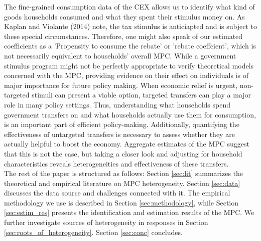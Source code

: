The fine-grained consumption data of the CEX allows us to identify what kind of goods households consumed and what they spent their stimulus money on. As Kaplan and Violante (2014) note, the tax stimulus is anticiapted and is subject to these special circumstances. Therefore, one might also speak of our estimated coefficients as a 'Propensity to consume the rebate' or 'rebate coeffcient', which is not necessarily equivalent to households' overall MPC. While a government stimulus program might not be perfectly appropriate to verify theoretical models concerned with the MPC, providing evidence on their effect on individuals is of major importance for future policy making. When economic relief is urgent, non-targeted stimuli can present a viable option, targeted transfers can play a major role in many policy settings. Thus, understanding what households spend government transfers on and what households actually use them for consumption, is an important part of efficient policy-making. Additionally, quantifying the effectiveness of untargeted transfers is necessary to assess whether they are actually helpful to boost the economy. Aggregate estimates of the MPC suggest that this is not the case, but taking a closer look and adjusting for household characteristics reveals heterogeneities and effectiveness of these transfers. \\ 
The rest of the paper is structured as follows: Section \ref{sec:lit} summarizes the theoretical and empirical literature on MPC heterogeneity. Section \ref{sec:data} discusses the data source and challenges connected with it. The empirical methodology we use is described in Section \ref{sec:methodology}, while Section \ref{sec:estim_res} presents the identification and estimation results of the MPC. We further investigate sources of heterogeneity in responses in Section \ref{sec:roots_of_heterogeneity}. Section \ref{sec:conc} concludes.